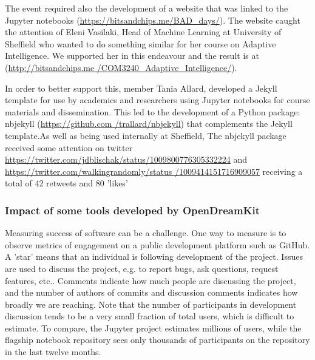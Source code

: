 \begin{enumerate}
The event required also the development of a website that was linked to the Jupyter notebooks (\url{https://bitsandchips.me/BAD_days/}). The
website caught the attention of Eleni Vasilaki, Head of Machine Learning at University of Sheffield who wanted to do something similar for
her course on Adaptive Intelligence. We supported her in this endeavour and the result is at (\url{http://bitsandchips.me
/COM3240_Adaptive_Intelligence/}).

In order to better support this, \ODK member Tania Allard, developed a Jekyll template for use by academics and researchers using Jupyter
notebooks for course materials and dissemination. This led to the development of a Python package: nbjekyll (\url{https://github.com
/trallard/nbjekyll}) that complements the Jekyll template.As well as being used internally at Sheffield, The nbjekyll package received some
attention on twitter \url{https://twitter.com/jdblischak/status/1009800776305332224} and \url{https://twitter.com/walkingrandomly/status
/1009414151716909057} receiving a total of 42 retweets and 80 'likes'%
\end{enumerate}

\subsubsection{Impact of some tools developed by OpenDreamKit}




Measuring success of software can be a challenge.
One way to measure is to observe metrics of engagement on
a public development platform such as GitHub.
A 'star' means that an individual is following development of the project.
Issues are used to discuss the project, e.g. to report bugs, ask questions, request features, etc..
Comments indicate how much people are discussing the project,
and the number of authors of commits and discussion comments indicates
how broadly we are reaching.
Note that the number of participants in development discussion tends to be a very small fraction of total users,
which is difficult to estimate.
To compare, the Jupyter project estimates millions of users,
while the flagship notebook repository sees only thousands of participants on the repository in the last twelve months.

